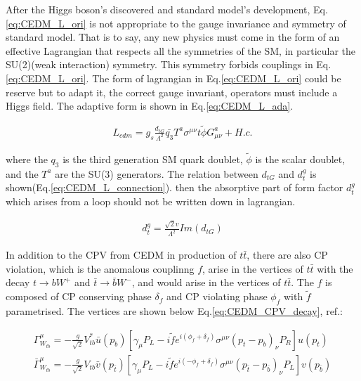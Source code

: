 		After the Higgs boson's discovered and standard model's development, Eq.\ref{eq:CEDM_L_ori} is not appropriate to the gauge invariance and symmetry of standard model. That is to say, any new physics must come in the form of an effective Lagrangian that respects all the symmetries of the SM, in particular the SU(2)(weak interaction) symmetry. This symmetry forbids couplings in Eq.\ref{eq:CEDM_L_ori}. The form of lagrangian in Eq.\ref{eq:CEDM_L_ori} could be reserve but to adapt it, the correct gauge invariant, operators must include a Higgs field. The adaptive form is shown in Eq.\ref{eq:CEDM_L_ada}.

		\begin{equation}
		\begin{split}
		L_{cdm} = g_s \frac{d_{tG}}{\Lambda^2} \bar{q_3} T^a\sigma^{\mu \nu} t \widetilde{\phi} G^a_{\mu \nu} + H.c.
		\label{eq:CEDM_L_ada}
		\end{split}
		\end{equation}
		\FloatBarrier

		where the $q_3$ is the third generation SM quark doublet, $\widetilde{\phi}$ is the scalar doublet, and the $T^a$ are the SU(3) generators. The relation between $d_{tG}$ and $d_t^g$ is shown(Eq.\ref{eq:CEDM_L_connection}). then the absorptive part of form factor $d_t^g$ which arises from a loop should not be written down in lagrangian.

		\begin{equation}
		\begin{split}
		d_t^g = \frac{\sqrt{2} v}{\Lambda^2} Im(d_{tG})
		\label{eq:CEDM_L_connection}
		\end{split}
		\end{equation}
		\FloatBarrier

		In addition to the CPV from CEDM in production of $t\bar{t}$, there are also CP violation, which is the anomalous couplinng $f$, arise in the vertices of $t\bar{t}$ with the decay $t \rightarrow bW^+$ and $\bar{t} \rightarrow \bar{b}W^-$, and would arise in the vertices of $t\bar{t}$. The $f$ is composed of CP conserving phase $\delta_f$ and CP violating phase $\phi_{f}$ with $\widetilde{f}$ parametrised. The vertices are shown below Eq.\ref{eq:CEDM_CPV_decay}, ref.\cite{PhysRevD.81.034013}:

		\begin{equation}
		\begin{split}
		\Gamma^{\mu}_{W_{tb}} = - \frac{g}{\sqrt{2}}V_{tb}^{*} \bar{u}(p_{b})[ \gamma_{\mu} P_{L} - i\widetilde{f}e^{i(\phi_f + \delta_f)} \sigma^{\mu \nu} (p_t - p_b)_{\nu} P_R ] u(p_t) \\
		\bar{\Gamma}^{\mu}_{W_{tb}} = - \frac{g}{\sqrt{2}}V_{tb} \bar{v}(p_{\bar{t}})[ \gamma_{\mu} P_{L} - i\widetilde{f}e^{i(-\phi_f + \delta_f)} \sigma^{\mu \nu} (p_{\bar{t}} - p_{\bar{b}})_{\nu} P_L ] v(p_{\bar{b}})
		\end{split}
		\label{eq:CEDM_CPV_decay}
		\end{equation}
		\FloatBarrier

